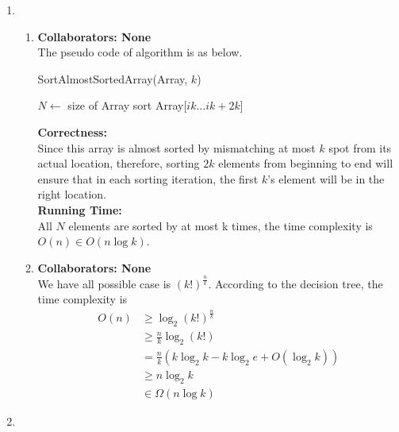 \documentclass[a4paper,12pt]{article}
\begin{document}
\begin{enumerate}
{}

\item {
\begin{enumerate}
    \item { \textbf{Collaborators: None} \\ The pseudo code of algorithm is as below.
    \newline
\begin{algorithm}
	\caption{SortAlmostSortedArray(Array, $k$)} 
	\begin{algorithmic}[1]
	    \State $N \gets$ size of Array
	        \State sort Array[$ik \ldots ik + 2k$]
	    \EndFor
	\end{algorithmic} 
\end{algorithm}

\textbf{Correctness:} \\
Since this array is almost sorted by mismatching at most $k$ spot from its actual location, therefore, sorting $2k$ elements from beginning to end will ensure that in each sorting iteration, the first $k$'s element will be in the right location. \\
\textbf{Running Time:} \\
All $N$ elements are sorted by at most k times, the time complexity is $O(n) \in O(n \log k)$.
}

\item {  \textbf{Collaborators: None} \\
We have all possible case is $(k!)^{\frac{n}{k}}$. According to the decision tree, the time complexity is
\[
\begin{split}
    O(n) & \geq \log _2(k!)^{\frac{n}{k}} \\ 
    & \geq \frac{n}{k} \log _2 (k!) \\ 
    & = \frac{n}{k} (k\log _2k - k\log _2e + O(\log _2k)) \\
    & \geq n\log _2k \\
    & \in \Omega (n\log k)
\end{split}
\]
}

\end{enumerate}
}

\item{

}
\end{enumerate}
\end{document}
